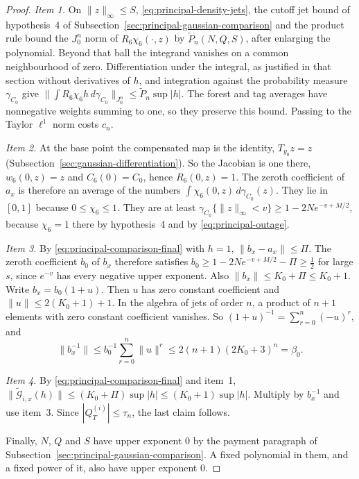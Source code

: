 \begin{proof}
\emph{Item 1.} On $\|z\|_\infty\le S$, \eqref{eq:principal-density-jets},
the cutoff jet bound of hypothesis~4 of
Subsection~\ref{sec:principal-gaussian-comparison} and the product rule bound
the $J^n_0$ norm of $R_6\chi_6(\cdot,z)$ by $\widetilde P_n(N,Q,S)$, after
enlarging the polynomial. Beyond that ball the integrand vanishes on a
common neighbourhood of zero. Differentiation under the integral, as
justified in that section without derivatives of $h$, and integration
against the probability measure $\gamma_{C_0}$ give
$\|\int R_6\chi_6h\,d\gamma_{C_0}\|_{J^n_0}\le\widetilde P_n\sup|h|$. The
forest and tag averages have nonnegative weights summing to one, so they
preserve this bound. Passing to the Taylor $\ell^1$ norm costs $c_n$.

\emph{Item 2.} At the base point the compensated map is the identity,
$T_{y_0}z=z$ (Subsection~\ref{sec:gaussian-differentiation}). So the
Jacobian is one there, $w_6(0,z)=z$ and $C_6(0)=C_0$, hence
$R_6(0,z)=1$. The zeroth coefficient of $a_x$ is therefore an average of
the numbers $\int\chi_6(0,z)\,d\gamma_{C_0}(z)$. They lie in $[0,1]$
because $0\le\chi_6\le1$. They are at least
$\gamma_{C_0}\{\|z\|_\infty<v\}\ge1-2Ne^{-v+M/2}$, because $\chi_6=1$
there by hypothesis~4 and by \eqref{eq:principal-outage}.

\emph{Item 3.} By \eqref{eq:principal-comparison-final} with $h=1$,
$\|b_x-a_x\|\le\Pi$. The zeroth
coefficient $b_0$ of $b_x$ therefore satisfies
$b_0\ge1-2Ne^{-v+M/2}-\Pi\ge\frac12$ for large $s$, since $e^{-v}$ has
every negative upper exponent. Also $\|b_x\|\le K_0+\Pi\le K_0+1$. Write
$b_x=b_0(1+u)$. Then $u$ has zero constant coefficient and
$\|u\|\le2(K_0+1)+1$. In the algebra of jets of order $n$, a product of
$n+1$ elements with zero constant coefficient vanishes. So
$(1+u)^{-1}=\sum_{r=0}^n(-u)^r$, and
\[
 \|b_x^{-1}\|\le b_0^{-1}\sum_{r=0}^n\|u\|^r\le2(n+1)(2K_0+3)^n=\beta_0 .
\]

\emph{Item 4.} By \eqref{eq:principal-comparison-final} and item~1,
$\|\widetilde{\mathcal G}_{i,x}(h)\|\le(K_0+\Pi)\sup|h|\le(K_0+1)\sup|h|$.
Multiply by $b_x^{-1}$ and use item~3. Since $|Q^{(i)}_T|\le\tau_n$, the
last claim follows.

Finally, $N$, $Q$ and $S$ have upper exponent $0$ by the payment
paragraph of Subsection~\ref{sec:principal-gaussian-comparison}. A fixed
polynomial in them, and a fixed power of it, also have upper exponent $0$.
\end{proof}

